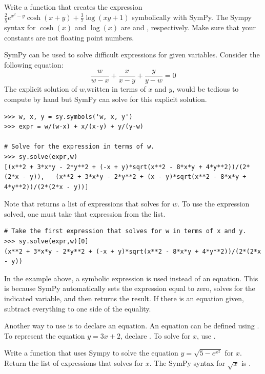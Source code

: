 \begin{problem}
Write a function that creates the expression $\frac{2}{5} e^{x^2-y}\cosh(x+y) + \frac{3}{7}\log(xy+1)$ symbolically with SymPy.
The Sympy syntax for $\cosh(x)$ and $\log(x)$ are and , respectively.
Make sure that your constants are not floating point numbers.
\end{problem}

SymPy can be used to solve difficult expressions for given variables.
Consider the following equation:
\[
\frac{w}{w-x}+\frac{x}{x-y}+\frac{y}{y-w}=0
\]
The explicit solution of $w$,written in terms of $x$ and $y$, would be tedious to compute by hand but SymPy can solve for this explicit solution.
\begin{lstlisting}
>>> w, x, y = sy.symbols('w, x, y')
>>> expr = w/(w-x) + x/(x-y) + y/(y-w)

# Solve for the expression in terms of w.
>>> sy.solve(expr,w)
[(x**2 + 3*x*y - 2*y**2 + (-x + y)*sqrt(x**2 - 8*x*y + 4*y**2))/(2*(2*x - y)),   (x**2 + 3*x*y - 2*y**2 + (x - y)*sqrt(x**2 - 8*x*y + 4*y**2))/(2*(2*x - y))]
\end{lstlisting}

Note that  returns a list of expressions that solves for $w$.
To use the expression solved, one must take that expression from the list.

\begin{lstlisting}
# Take the first expression that solves for w in terms of x and y.
>>> sy.solve(expr,w)[0]
(x**2 + 3*x*y - 2*y**2 + (-x + y)*sqrt(x**2 - 8*x*y + 4*y**2))/(2*(2*x - y))
\end{lstlisting}

In the example above, a symbolic expression is used instead of an equation.
This is because SymPy automatically sets the expression equal to zero, solves for the indicated variable, and then returns the result.
If there is an equation given, subtract everything to one side of the equality.

Another way to use  is to declare an equation.
An equation can be defined using .
To represent the equation $y=3x+2$, declare .
To solve for $x$, use .

\begin{problem}
Write a function that uses Sympy to solve the equation $y = \sqrt{5-e^{x^2}}$ for $x$.
Return the list of expressions that solves for $x$. The SymPy syntax for $\sqrt{x}$ is .
\end{problem}

